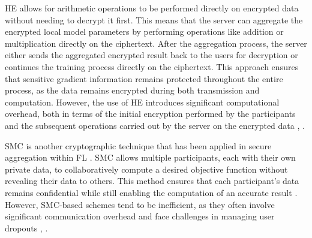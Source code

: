 HE allows for arithmetic operations to be performed directly on encrypted data without needing to decrypt it first. This means that the server can aggregate the encrypted local model parameters by performing operations like addition or multiplication directly on the ciphertext. After the aggregation process, the server either sends the aggregated encrypted result back to the users for decryption or continues the training process directly on the ciphertext. This approach ensures that sensitive gradient information remains protected throughout the entire process, as the data remains encrypted during both transmission and computation. However, the use of HE introduces significant computational overhead, both in terms of the initial encryption performed by the participants and the subsequent operations carried out by the server on the encrypted data \cite{Liu2023}, \cite{Liu2022}. 

\par 
SMC is another cryptographic technique that has been applied in secure aggregation within FL \cite{So2021, Kadhe2020, So2022ML}. SMC allows multiple participants, each with their own private data, to collaboratively compute a desired objective function without revealing their data to others. This method ensures that each participant’s data remains confidential while still enabling the computation of an accurate result \cite{Yin2021}. However, SMC-based schemes tend to be inefficient, as they often involve significant communication overhead and face challenges in managing user dropouts \cite{Ma2023}, \cite{Liu2022}.

